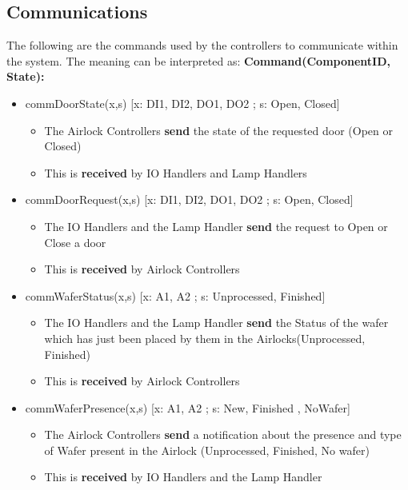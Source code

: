 \documentclass[a4paper,12pt]{article}
\begin{document}
\subsection {Communications}
The following are the commands used by the controllers to communicate within the system. The meaning can be interpreted as: 
\bigskip
\newline 
\textbf{Command(ComponentID, State):}
\begin{itemize}
\item commDoorState(x,s) [x: DI1, DI2, DO1, DO2 ; s: Open, Closed] 
\begin{itemize}
    \item The Airlock Controllers \textbf{send} the state of the requested door (Open or Closed)
    \item This is \textbf{received} by IO Handlers and Lamp Handlers
\end{itemize}
\bigskip

\item commDoorRequest(x,s) [x: DI1, DI2, DO1, DO2 ; s: Open, Closed]
\begin{itemize}
    \item The IO Handlers and the Lamp Handler \textbf{send} the request to Open or Close a door 
    \item This is \textbf{received} by Airlock Controllers
\end{itemize}
\bigskip

\item commWaferStatus(x,s) [x: A1, A2 ; s: Unprocessed, Finished]
\begin{itemize}
    \item The IO Handlers and the Lamp Handler \textbf{send} the Status of the wafer which has just been placed by them in the Airlocks(Unprocessed, Finished) 
    \item This is \textbf{received} by Airlock Controllers
\end{itemize}
\bigskip

\item commWaferPresence(x,s) [x: A1, A2 ; s: New, Finished , NoWafer]
\begin{itemize}
    \item The Airlock Controllers \textbf{send} a notification about the presence and type of Wafer present in the Airlock (Unprocessed, Finished, No wafer) 
    \item This is \textbf{received} by IO Handlers and the Lamp Handler
\end{itemize}
\end{itemize}
\newpage
\end{document}
